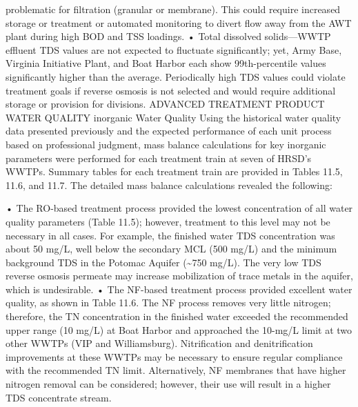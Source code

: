 \documentclass{article}
\begin{document}
problematic for filtration (granular or membrane). This could require
increased storage or treatment or automated monitoring to divert flow
away from the AWT plant during high BOD and TSS loadings. • Total
dissolved solids---WWTP effluent TDS values are not expected to
fluctuate significantly; yet, Army Base, Virginia Initiative Plant, and
Boat Harbor each show 99th-percentile values significantly higher than
the average. Periodically high TDS values could violate treatment goals
if reverse osmosis is not selected and would require additional storage
or provision for divisions. ADVANCED TREATMENT PRODUCT WATER QUALITY
inorganic Water Quality Using the historical water quality data
presented previously and the expected performance of each unit process
based on professional judgment, mass balance calculations for key
inorganic parameters were performed for each treatment train at seven of
HRSD's WWTPs. Summary tables for each treatment train are provided in
Tables 11.5, 11.6, and 11.7. The detailed mass balance calculations
revealed the following:

• The RO-based treatment process provided the lowest concentration of
all water quality parameters (Table 11.5); however, treatment to this
level may not be necessary in all cases. For example, the finished water
TDS concentration was about 50 mg/L, well below the secondary MCL (500
mg/L) and the minimum background TDS in the Potomac Aquifer
(\textasciitilde750 mg/L). The very low TDS reverse osmosis permeate may
increase mobilization of trace metals in the aquifer, which is
undesirable. • The NF-based treatment process provided excellent water
quality, as shown in Table 11.6. The NF process removes very little
nitrogen; therefore, the TN concentration in the finished water exceeded
the recommended upper range (10 mg/L) at Boat Harbor and approached the
10-mg/L limit at two other WWTPs (VIP and Williamsburg). Nitrification
and denitrification improvements at these WWTPs may be necessary to
ensure regular compliance with the recommended TN limit. Alternatively,
NF membranes that have higher nitrogen removal can be considered;
however, their use will result in a higher TDS concentrate stream.
\end{document}
